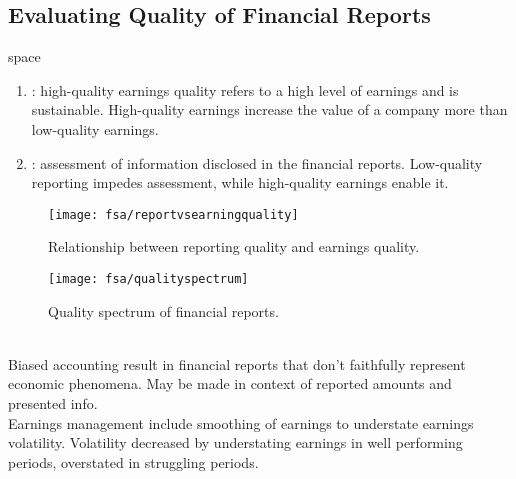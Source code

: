 \subsection{Evaluating Quality of Financial Reports}

\begin{definition}{\color{white}space}
\begin{enumerate}[label=\roman*.]
\setlength{\itemsep}{0pt}
\item {}: high-quality earnings quality refers to a high level of earnings and is sustainable. High-quality earnings increase the value of a company more than low-quality earnings.
\item {}: assessment of information disclosed in the financial reports. Low-quality reporting impedes assessment, while high-quality earnings enable it.
\end{enumerate}
\end{definition}

\begin{figure}[H]
\centering
\texttt{[image: fsa/reportvsearningquality]}
\caption{Relationship between reporting quality and earnings quality.}
\end{figure}

\begin{figure}[H]
\centering
\texttt{[image: fsa/qualityspectrum]}
\caption{Quality spectrum of financial reports.}
\end{figure}

\begin{remark} \\
Biased accounting result in financial reports that don’t faithfully represent economic phenomena. May be made in context of reported amounts and presented info.\\
Earnings management include smoothing of earnings to understate earnings volatility. Volatility decreased by understating earnings in well performing periods, overstated in struggling periods.
\end{remark}

\newpage 

